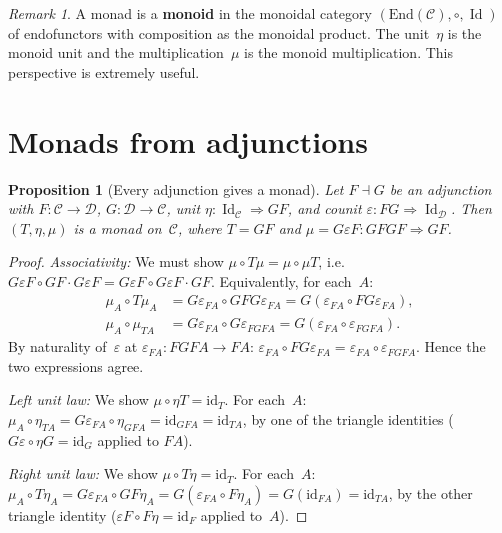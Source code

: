 \documentclass[a4paper,12pt]{book}
\DeclareMathOperator{\Id}{Id}
\newcommand{\id}{\mathrm{id}}
\theoremstyle{definition}
\theoremstyle{plain}
\newtheorem{proposition}[definition]{Proposition}
\theoremstyle{remark}
\newtheorem{remark}[definition]{Remark}
\begin{document}
\begin{remark}\label{rem:monad-as-monoid}
A monad is a \textbf{monoid} in the monoidal category
$(\mathrm{End}(\mathcal{C}),\circ,\Id)$ of endofunctors with
composition as the monoidal product.  The unit~$\eta$ is the monoid
unit and the multiplication~$\mu$ is the monoid multiplication.
This perspective is extremely useful.
\end{remark}


\section{Monads from adjunctions}\label{sec:monad-adj}

\begin{proposition}[Every adjunction gives a monad]%
\label{prop:adj-monad}
Let $F\dashv G$ be an adjunction with
$F\colon\mathcal{C}\to\mathcal{D}$, $G\colon\mathcal{D}\to\mathcal{C}$,
unit $\eta\colon\Id_{\mathcal{C}}\Rightarrow GF$, and counit
$\varepsilon\colon FG\Rightarrow\Id_{\mathcal{D}}$.
Then $(T,\eta,\mu)$ is a monad on~$\mathcal{C}$, where $T = GF$ and
$\mu = G\varepsilon F\colon GFGF\Rightarrow GF$.
\end{proposition}

\begin{proof}
\textit{Associativity:}
We must show $\mu\circ T\mu = \mu\circ\mu T$, i.e.\
$G\varepsilon F\circ GF\cdot G\varepsilon F
= G\varepsilon F\circ G\varepsilon F\cdot GF$.
Equivalently, for each~$A$:
\begin{align*}
    \mu_A \circ T\mu_A
    &= G\varepsilon_{FA}\circ GFG\varepsilon_{FA}
    = G(\varepsilon_{FA}\circ FG\varepsilon_{FA}), \\
    \mu_A \circ \mu_{TA}
    &= G\varepsilon_{FA}\circ G\varepsilon_{FGF A}
    = G(\varepsilon_{FA}\circ\varepsilon_{FGFA}).
\end{align*}
By naturality of~$\varepsilon$ at $\varepsilon_{FA}\colon FGFA\to FA$:
$\varepsilon_{FA}\circ FG\varepsilon_{FA} = \varepsilon_{FA}\circ\varepsilon_{FGFA}$.
Hence the two expressions agree.

\textit{Left unit law:} We show $\mu\circ\eta T = \id_T$.
For each~$A$:
$\mu_A\circ\eta_{TA} = G\varepsilon_{FA}\circ\eta_{GFA}
= \id_{GFA} = \id_{TA}$,
by one of the triangle identities ($G\varepsilon\circ\eta G = \id_G$
applied to $FA$).

\textit{Right unit law:} We show $\mu\circ T\eta = \id_T$.
For each~$A$:
$\mu_A\circ T\eta_A = G\varepsilon_{FA}\circ GF\eta_A
= G(\varepsilon_{FA}\circ F\eta_A) = G(\id_{FA}) = \id_{TA}$,
by the other triangle identity ($\varepsilon F\circ F\eta = \id_F$
applied to~$A$).
\end{proof}
\end{document}
